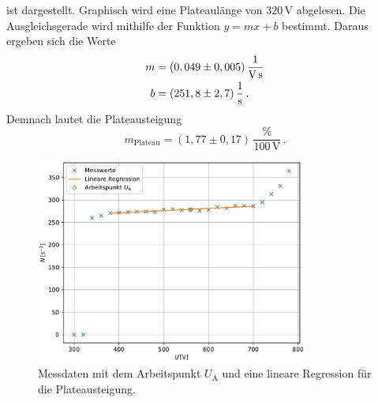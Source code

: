 ist dargestellt. Graphisch wird eine Plateaulänge von $320\,\unit{\volt}$ abgelesen. Die Ausgleichsgerade wird mithilfe der Funktion $y = mx+b$ bestimmt. Daraus ergeben sich die Werte
\begin{align*}
  m &= (0,049\pm0,005)\,\unit[per-mode=fraction]{\per\volt\per\second}\\
  b &= (251,8\pm2,7)\,\unit[per-mode=fraction]{\per\second}\,.
\end{align*}
Demnach lautet die Plateausteigung 
$$m_{\text{Plateau}} = (1,77\pm0,17)\,\frac{\%}{100\,\unit{\volt}}\,.$$
\begin{figure}[H]
  \centering
  \includegraphics[width=0.8\textwidth]{Kennlinie.pdf}
  \caption{Messdaten mit dem Arbeitspunkt $U_{\text{A}}$ und eine lineare Regression für die Plateausteigung.}
  \label{fig:Kennlinie_Plot}
\end{figure}

